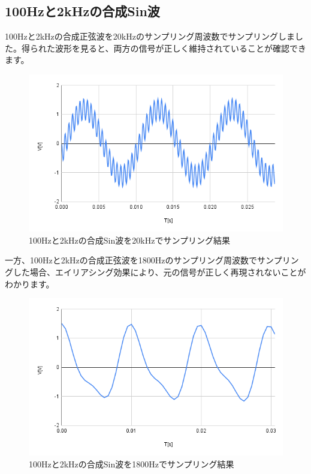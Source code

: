 \documentclass[a4paper,11pt,xelatex,ja=standard]{bxjsarticle}
\begin{document}
    \subsection{100Hzと2kHzの合成Sin波}

        100Hzと2kHzの合成正弦波を20kHzのサンプリング周波数でサンプリングしました。得られた波形を見ると、両方の信号が正しく維持されていることが確認できます。


        \begin{figure}[H]
            \centering
            \includegraphics[width=1.0\textwidth]{./img/24-4-2/100Hzと2kHzの合成Sin波を20kHzでサンプリング.png}
            \caption{100Hzと2kHzの合成Sin波を20kHzでサンプリング結果}
        \end{figure}

        一方、100Hzと2kHzの合成正弦波を1800Hzのサンプリング周波数でサンプリングした場合、エイリアシング効果により、元の信号が正しく再現されないことがわかります。

        \begin{figure}[H]
            \centering
            \includegraphics[width=1.0\textwidth]{./img/24-4-2/100Hzと2kHzの合成Sin波を1800Hzでサンプリング.png}
            \caption{100Hzと2kHzの合成Sin波を1800Hzでサンプリング結果}
        \end{figure}
\end{document}

